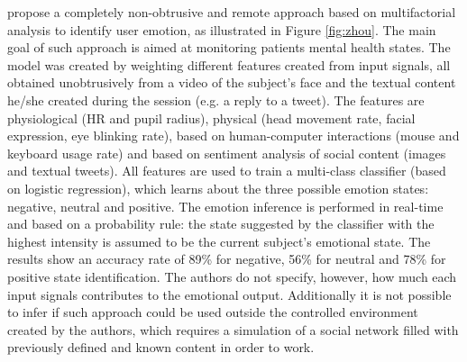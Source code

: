 \textcite{mental} propose a completely non-obtrusive and remote approach based on multifactorial analysis to identify user emotion, as illustrated in Figure \ref{fig:zhou}. The main goal of such approach is aimed at monitoring patients mental health states. The model was created by weighting different features created from input signals, all obtained unobtrusively from a video of the subject's face and the textual content he/she created during the session (e.g. a reply to a tweet). The features are physiological (HR and pupil radius), physical (head movement rate, facial expression, eye blinking rate), based on human-computer interactions (mouse and keyboard usage rate) and based on sentiment analysis of social content (images and textual tweets). All features are used to train a multi-class classifier (based on logistic regression), which learns about the three possible emotion states: negative, neutral and positive. The emotion inference is performed in real-time and based on a probability rule: the state suggested by the classifier with the highest intensity is assumed to be the current subject's emotional state. The results show an accuracy rate of 89\% for negative, 56\% for neutral and 78\% for positive state identification. The authors do not specify, however, how much each input signals contributes to the emotional output. Additionally it is not possible to infer if such approach could be used outside the controlled environment created by the authors, which requires a simulation of a social network filled with previously defined and known content in order to work.

